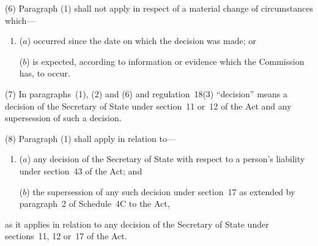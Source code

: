 \documentclass[a4paper,12pt]{article}
\begin{document}
%
%
%

(6) Paragraph (1) shall not apply in respect of a material change of circumstances which—
\begin{enumerate}\item[]
($a$) occurred since the date on which the decision was made; or

($b$) is expected, according to information or evidence which the Commission has, to occur.
\end{enumerate}

(7) In paragraphs~(1), (2) and (6) and regulation~18(3) “decision” means a decision of the Secretary of State under section~11 or~12 of the Act and any supersession of such a decision.

(8) Paragraph (1) shall apply in relation to---
\begin{enumerate}\item[]
($a$) any decision of the Secretary of State with respect to 
a person’s liability under section~43 of the Act; and

($b$) the supersession of any such decision under section~17 as extended by paragraph~2 of Schedule~4C to the Act,
\end{enumerate}
as it applies in relation to any decision of the Secretary of State under sections~11, 12 or~17 of the Act.
\end{document}
